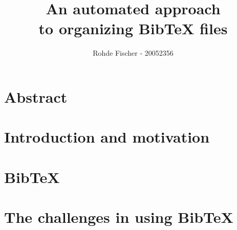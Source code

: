 \documentclass[twoside,11pt,openright,a4paper]{report}
\newcommand{\bibtex}{Bib{\TeX}}
\begin{document}
\pagestyle{empty}
\begin{titlepage}
\author{Rohde Fischer - 20052356}
\title{An automated approach\\to organizing {\bibtex} files}
{\maketitle}

\end{titlepage}


\pagestyle{plain}
\setcounter{page}{1}



\chapter*{Abstract}

%
%
{\tableofcontents}

\setcounter{secnumdepth}{2}


\chapter{Introduction and motivation}
\label{ch:intro}


\chapter{{\bibtex}}
\label{ch:about}


\chapter{The challenges in using {\bibtex}}
\label{ch:problem-description}

\end{document}
